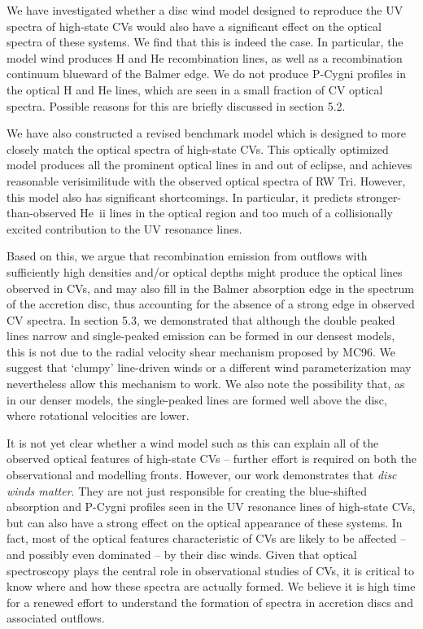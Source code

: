 We have investigated whether a disc wind model designed to reproduce
the UV spectra of high-state CVs would also have a significant effect
on the optical spectra of these systems. We find that this is indeed
the case. In particular, the model wind produces H and He
recombination lines, as well as a recombination continuum blueward of
the Balmer edge. We do not produce P-Cygni profiles
in the optical H and He lines, 
which are seen in a small fraction of CV optical spectra.
Possible reasons for this are briefly discussed in section 
5.2.

We have also constructed a revised benchmark model which is designed
to more closely match the optical spectra of high-state CVs. This
optically optimized model produces all the prominent optical lines in
and out of eclipse, and achieves reasonable verisimilitude with the
observed optical spectra of RW Tri. However, this model also has
significant shortcomings. In particular, it predicts
stronger-than-observed He~{\sc ii} lines in the optical region and too
much of a collisionally excited contribution to the UV resonance lines. 

Based on this, we argue that recombination emission 
from outflows with sufficiently high densities and/or optical depths 
might produce the optical lines observed in CVs, and may also 
fill in the Balmer absorption edge in the spectrum of the accretion disc, 
thus accounting for the absence of a strong edge in observed CV spectra.
In section 5.3, we demonstrated that
although the double peaked lines narrow and 
single-peaked emission can be formed in our densest models, 
this is not due to the radial velocity shear mechanism proposed by MC96.
We suggest that `clumpy' line-driven winds or a different
wind parameterization may nevertheless allow this mechanism to work.
We also note the possibility that, as in our denser models, 
the single-peaked lines are formed well above the disc, where 
rotational velocities are lower.

It is not yet clear whether a wind model such as this can
explain all of the observed optical features of high-state CVs --
further effort is required on both the observational
and modelling fronts.
However, our work demonstrates that {\sl disc winds matter}. They are
not just responsible for creating the blue-shifted absorption and
P-Cygni profiles seen in the UV resonance lines of high-state CVs, but
can also have a strong effect on the optical appearance of these
systems. In fact, most of the optical features characteristic of CVs
are likely to be affected -- and possibly even dominated -- by their disc
winds. Given that optical spectroscopy plays the central role in
observational studies of CVs, it is critical to know 
where and how these spectra are actually formed. We believe it is high
time for a renewed effort to understand the formation of spectra in
accretion discs and associated outflows. 


